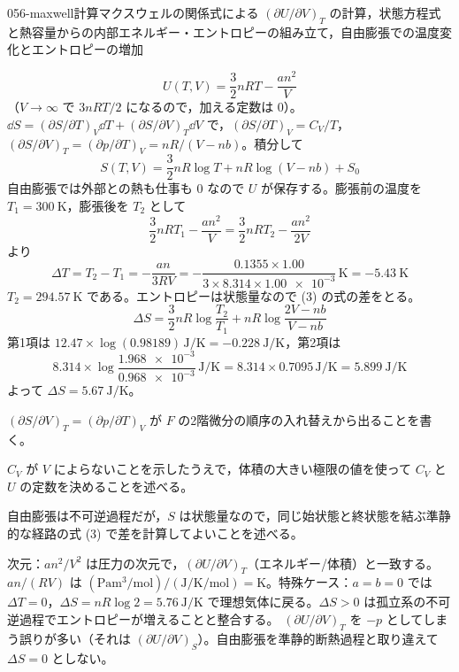 \documentclass[uplatex,dvipdfmx,a4paper,11pt]{jsarticle}
\begin{document}
\begin{mondai}{056-maxwell}{計算}{マクスウェルの関係式による $(\partial U/\partial V)_{T}$ の計算，状態方程式と熱容量からの内部エネルギー・エントロピーの組み立て，自由膨張での温度変化とエントロピーの増加}
\begin{tadashii}
\[ U(T,V)=\frac{3}{2}nRT-\frac{an^{2}}{V} \]
（$V\to\infty$ で $3nRT/2$ になるので，加える定数は $0$）。
 $\dd S=(\partial S/\partial T)_{V}\dd T+(\partial S/\partial V)_{T}\dd V$ で，$(\partial S/\partial T)_{V}=C_{V}/T$，$(\partial S/\partial V)_{T}=(\partial p/\partial T)_{V}=nR/(V-nb)$。積分して
\[ S(T,V)=\frac{3}{2}nR\log T+nR\log(V-nb)+S_{0} \]
 自由膨張では外部との熱も仕事も $0$ なので $U$ が保存する。膨張前の温度を $T_{1}=\qty{300}{\kelvin}$，膨張後を $T_{2}$ として
\[ \frac{3}{2}nRT_{1}-\frac{an^{2}}{V}=\frac{3}{2}nRT_{2}-\frac{an^{2}}{2V} \]
より
\[ \Delta T=T_{2}-T_{1}=-\frac{an}{3RV}=-\frac{\num{0.1355}\times\num{1.00}}{3\times\num{8.314}\times\num{1.00e-3}}\,\unit{\kelvin}=\qty{-5.43}{\kelvin} \]
$T_{2}=\qty{294.57}{\kelvin}$ である。エントロピーは状態量なので (3) の式の差をとる。
\[ \Delta S=\frac{3}{2}nR\log\frac{T_{2}}{T_{1}}+nR\log\frac{2V-nb}{V-nb} \]
第1項は $\num{12.47}\times\log(\num{0.98189})\,\unit{\joule\per\kelvin}=\qty{-0.228}{\joule\per\kelvin}$，第2項は
\[ \num{8.314}\times\log\frac{\num{1.968e-3}}{\num{0.968e-3}}\,\unit{\joule\per\kelvin}=\num{8.314}\times\num{0.7095}\,\unit{\joule\per\kelvin}=\qty{5.899}{\joule\per\kelvin} \]
よって $\Delta S=\qty{5.67}{\joule\per\kelvin}$。
\begin{ronten}
  \item {} $(\partial S/\partial V)_{T}=(\partial p/\partial T)_{V}$ が $F$ の2階微分の順序の入れ替えから出ることを書く。
  \item {} $C_{V}$ が $V$ によらないことを示したうえで，体積の大きい極限の値を使って $C_{V}$ と $U$ の定数を決めることを述べる。
  \item {} 自由膨張は不可逆過程だが，$S$ は状態量なので，同じ始状態と終状態を結ぶ準静的な経路の式 (3) で差を計算してよいことを述べる。
\end{ronten}
\kenzan 次元：$an^{2}/V^{2}$ は圧力の次元で，$(\partial U/\partial V)_{T}$（エネルギー/体積）と一致する。$an/(RV)$ は $(\unit{\pascal\cubic\metre\per\mole})/(\unit{\joule\per\kelvin\per\mole})=\unit{\kelvin}$。特殊ケース：$a=b=0$ では $\Delta T=0$，$\Delta S=nR\log2=\qty{5.76}{\joule\per\kelvin}$ で理想気体に戻る。$\Delta S>0$ は孤立系の不可逆過程でエントロピーが増えることと整合する。
\tsumazuki $(\partial U/\partial V)_{T}$ を $-p$ としてしまう誤りが多い（それは $(\partial U/\partial V)_{S}$）。自由膨張を準静的断熱過程と取り違えて $\Delta S=0$ としない。
\end{tadashii}
\end{mondai}
\end{document}
